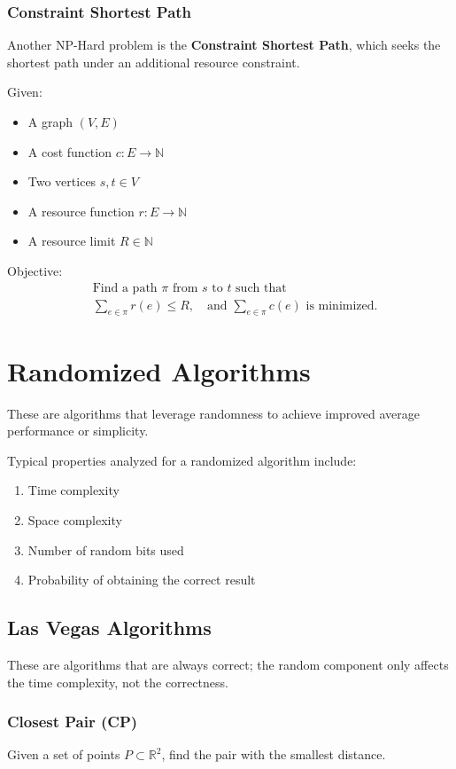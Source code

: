\documentclass{article}
\begin{document}
\subsubsection{Constraint Shortest Path}
Another NP-Hard problem is the \textbf{Constraint Shortest Path}, which seeks the 
shortest path under an additional resource constraint.

Given:
\begin{itemize}
    \item A graph $(V,E)$
    \item A cost function $c: E \to \mathbb{N}$
    \item Two vertices $s,t \in V$
    \item A resource function $r: E \to \mathbb{N}$
    \item A resource limit $R \in \mathbb{N}$
\end{itemize}

Objective:
\[
\begin{aligned}
&\text{Find a path } \pi \text{ from } s \text{ to } t \text{ such that} \\
&\sum_{e \in \pi} r(e) \le R, \quad 
\text{and } \sum_{e \in \pi} c(e) \text{ is minimized.}
\end{aligned}
\]

\section{Randomized Algorithms}
These are algorithms that leverage randomness to achieve improved 
average performance or simplicity.

Typical properties analyzed for a randomized algorithm include:
\begin{enumerate}
    \item Time complexity
    \item Space complexity
    \item Number of random bits used
    \item Probability of obtaining the correct result
\end{enumerate}

\subsection{Las Vegas Algorithms}
These are algorithms that are always correct; the random component only affects the time complexity, not the correctness.

\subsubsection{Closest Pair (CP)}
Given a set of points $P \subset \mathbb{R}^2$, find the pair with the smallest distance.
\end{document}
